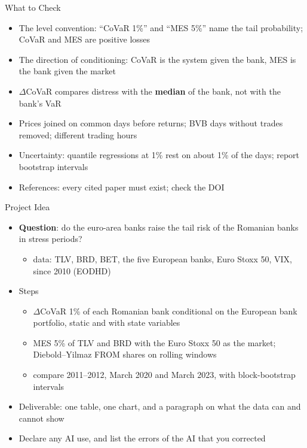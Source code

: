 \begin{frame}{What to Check}
\itemsize{\small}
\begin{itemize}
    \item The level convention: ``CoVaR 1\%'' and ``MES 5\%'' name the tail probability; CoVaR and MES are positive losses
    \item The direction of conditioning: CoVaR is the system given the bank, MES is the bank given the market
    \item $\Delta$CoVaR compares distress with the \textbf{median} of the bank, not with the bank's VaR
    \item Prices joined on common days before returns; BVB days without trades removed; different trading hours
    \item Uncertainty: quantile regressions at 1\% rest on about 1\% of the days; report bootstrap intervals
    \item References: every cited paper must exist; check the DOI
\end{itemize}
\end{frame}

\begin{frame}{Project Idea}
\itemsize{\small}
\begin{itemize}
    \item \textbf{Question}: do the euro-area banks raise the tail risk of the Romanian banks in stress periods?
    \begin{itemize}
        \item data: TLV, BRD, BET, the five European banks, Euro Stoxx 50, VIX, since 2010 (EODHD)
    \end{itemize}
    \item Steps
    \begin{itemize}
        \item $\Delta$CoVaR 1\% of each Romanian bank conditional on the European bank portfolio, static and with state variables
        \item MES 5\% of TLV and BRD with the Euro Stoxx 50 as the market; Diebold--Yilmaz FROM shares on rolling windows
        \item compare 2011--2012, March 2020 and March 2023, with block-bootstrap intervals
    \end{itemize}
    \item Deliverable: one table, one chart, and a paragraph on what the data can and cannot show
    \item Declare any AI use, and list the errors of the AI that you corrected
\end{itemize}
\end{frame}


